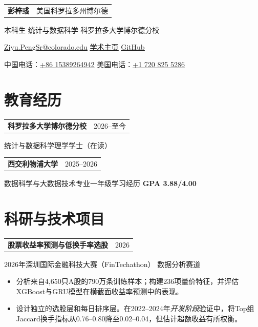 \documentclass[10pt,letterpaper]{article}
\makeatletter
\newcommand{\entry}[2]{%
  \begin{tabularx}{\textwidth}{@{}>{\raggedright\arraybackslash}X@{\hspace{12pt}}r@{}}
    \textbf{#1} & {\fontsize{9.5}{11.5}\selectfont\color{muted}#2}
  \end{tabularx}}
\newcommand{\detail}[1]{%
  {\fontsize{9.5}{11.8}\selectfont\color{muted}#1\par}}
\newcommand{\cvlink}[2]{\href{#1}{\underline{#2}}}
\makeatother
\begin{document}
\color{ink}
\fontsize{10}{12.2}\selectfont

\begin{tabularx}{\textwidth}{@{}Xr@{}}
  {\rmfamily\fontsize{29}{32}\selectfont\bfseries 彭梓彧}
  & {\fontsize{9.5}{11.5}\selectfont\color{muted}美国科罗拉多州博尔德}
\end{tabularx}
\vspace{5pt}

{\fontsize{9.5}{11.5}\selectfont
本科生 \textperiodcentered{} 统计与数据科学 \textperiodcentered{} 科罗拉多大学博尔德分校\par}
\vspace{5pt}
{\fontsize{9.5}{11.5}\selectfont
\cvlink{mailto:Ziyu.PengSr@colorado.edu}{Ziyu.PengSr@colorado.edu}
\hspace{14pt}
\cvlink{https://pzy54154631-hub.github.io/homepage/}{学术主页}
\hspace{14pt}
\cvlink{https://github.com/pzy54154631-hub}{GitHub}\par}
\vspace{3pt}
{\fontsize{9.5}{11.5}\selectfont
中国电话：\cvlink{tel:+8615389264942}{+86 15389264942}
\hspace{14pt}
美国电话：\cvlink{tel:+17208255286}{+1 720 825 5286}\par}

\section*{教育经历}
\entry{科罗拉多大学博尔德分校}{2026--至今}
\detail{统计与数据科学理学学士（在读）}
\vspace{6pt}
\entry{西交利物浦大学}{2025--2026}
\detail{数据科学与大数据技术专业一年级学习经历 \textperiodcentered{} \textbf{GPA 3.88/4.00}}

\section*{科研与技术项目}
\entry{股票收益率预测与低换手率选股}{2026}
\detail{2026年深圳国际金融科技大赛（FinTechathon）\textperiodcentered{} 数据分析赛道}
\begin{itemize}
  \item 分析来自4,650只A股的790万条训练样本；构建236项量价特征，并评估XGBoost与GRU模型在横截面收益率预测中的表现。
  \item 设计独立的选股层和每日排序层。在2022--2024年\emph{开发阶段}验证中，将Top组Jaccard换手指标从0.76--0.80降至0.02--0.04，但估计超额收益有所权衡。
\end{itemize}
\end{document}
